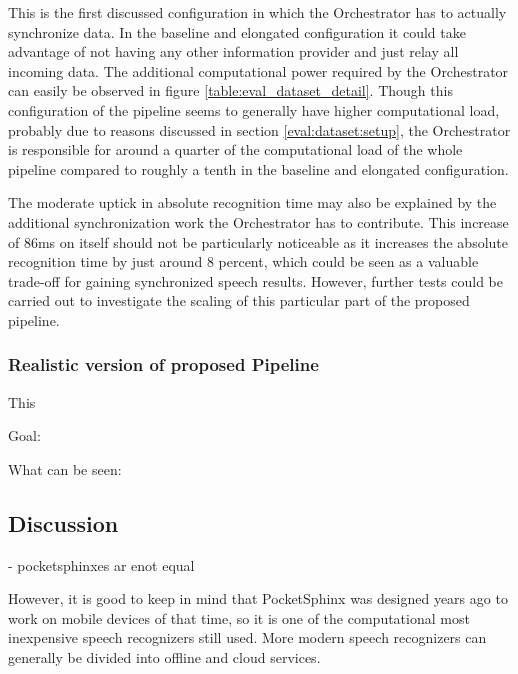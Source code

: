 This is the first discussed configuration in which the Orchestrator has to actually synchronize data. 
In the baseline and elongated configuration it could take advantage of not having any other information provider and just relay all incoming data.
The additional computational power required by the Orchestrator can easily be observed in figure \ref{table:eval_dataset_detail}.
Though this configuration of the pipeline seems to generally have higher computational load, probably due to reasons discussed in section \ref{eval:dataset:setup}, the Orchestrator is responsible for around a quarter of the computational load of the whole pipeline compared to roughly a tenth in the baseline and elongated configuration.

The moderate uptick in absolute recognition time may also be explained by the additional synchronization work the Orchestrator has to contribute. 
This increase of 86ms on itself should not be particularly noticeable as it increases the absolute recognition time by just around 8 percent, which could be seen as a valuable trade-off for gaining synchronized speech results. 
However, further tests could be carried out to investigate the scaling of this particular part of the proposed pipeline.


\subsubsection{Realistic version of proposed Pipeline}
This 

Goal: 

What can be seen: 


\subsection{Discussion}

- pocketsphinxes ar enot equal






However, it is good to keep in mind that PocketSphinx was designed years ago to work on mobile devices of that time, so it is one of the computational most inexpensive speech recognizers still used. 
More modern speech recognizers can generally be divided into offline and cloud services.


